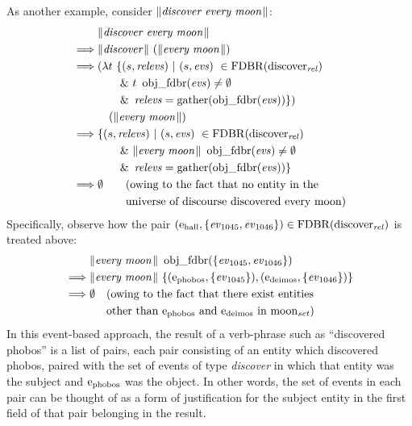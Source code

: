 \documentclass[../main.tex]{subfiles}
\begin{document}
\begin{refsection}
As another example, consider $\lVert\textit{discover every moon\hspace{0.1em}}\rVert$:
\begin{equation*}
	\begin{split}
		& \meaningof{discover every moon} \\
		\implies & \meaningof{discover}\ (\meaningof{every moon}) \\
		\implies & (\lambda t\ \{(s, \opit{relevs})\ |\ (s, \evs)\ \in \FDBR{\relation{\discover}}\ \\
		& \qquad \&\ t\ \objfdbr{\evs} \neq \emptyset  \\
		& \qquad \&\ \opit{relevs} = \gatherevs{\objfdbr{\evs}}\})\ \\
		& \quad (\meaningof{every moon}) \\
		\implies & \{(s, \opit{relevs})\ |\ (s, \evs)\ \in \FDBR{\relation{\discover}}\ \\
		& \qquad \&\ \meaningof{every moon}\ \objfdbr{\evs} \neq \emptyset \\
		& \qquad \&\ \opit{relevs} = \gatherevs{\objfdbr{\evs}} \} \\
		\implies & \emptyset \qquad(\dmathrm{owing to the fact that no entity in the} \\
		\phantom{\implies} & \phantom{\emptyset} \qquad \dmathrm{universe of discourse discovered every moon})
	\end{split}
\end{equation*}
Specifically, observe how the pair $(\mathrm{e}_{\operatorname{\operatorname{hall}}}, \{ \operatorname{\mathit{ev}}_{1045}, \operatorname{\mathit{ev}}_{1046} \}) \in \operatorname{FDBR}({\operatorname{\operatorname{discover}}_{\operatorname{\mathit{rel}}}})$ is treated above:
\begin{equation*}
	\begin{split}
		&\meaningof{every moon}\ \objfdbr{\{\eventassoc{1045}, \eventassoc{1046}\}} \\
		\implies & \meaningof{every moon}\ \{(\entityassoc{phobos}, \{\eventassoc{1045}\}), (\entityassoc{deimos}, \{\eventassoc{1046}\})\} \\
		\implies & \emptyset \quad (\dmathrm{owing to the fact that there exist entities}\ \\
		\phantom{\implies}	& \phantom{\emptyset} \quad \dmathrm{other than $\entity{phobos}$ and\ $\entity{deimos}$ in\ $\wordset{moon}$})
	\end{split}
\end{equation*}
In this event-based approach, the result of a verb-phrase such as ``discovered phobos'' is a list
of pairs, each pair consisting of an entity which discovered phobos, paired with the set of events of
type {\em discover} in which that entity was the subject and $\mathrm{e}_{\operatorname{phobos}}$ was the object.
In other words, the set of events in each pair can be thought of as a form of justification for the subject entity in the first field of that pair belonging in the result.


\end{refsection}
\end{document}
